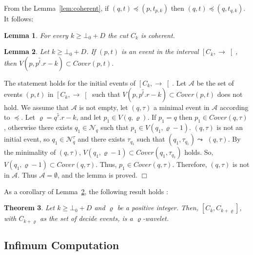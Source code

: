 \documentclass[11pt]{article}
\newenvironment{proof}{{\bf Proof. } }{{\hfill $\Box$}\vspace{.5pc}}
\newtheorem{theorem}{Theorem}[section]
\newtheorem{lemma}[theorem]{Lemma}
\begin{document}
From the Lemma~\ref{lem:coherent},  
if $\left( q,t\right) \preceq \left( p,t_{p,k}\right) $ then $\left( q,t\right)
\preceq \left( q,t_{q,k}\right) $. It follows:

\begin{lemma}
For every $k\geq \bot _{0} +D$ the cut $C_{k}$ is coherent.
\end{lemma}



\begin{lemma}
\label{lem:cover}
Let $k\geq \bot_0 + D$. If $\left( p,t\right) $ is an event in the interval  
$\left[ C_{k},\rightarrow \right[ $, then $V(p,\widetilde{p^{t}.r}-k)\subset
Cover(p,t)$.
\end{lemma}

\begin{proof}
The statement holds for the initial events of $\left[ C_{k},\rightarrow
\right[ $. Let $\mathcal{A}$ be the set of events $(p,t)$ in  $\left[
C_{k},\rightarrow \right[ $ such that $V(p,\widetilde{p^{t}.r}-k)\subset
Cover(p,t)$ does not hold.  We assume that $\mathcal{A}$ is not empty, let $(q,\tau )$ a minimal event in $\mathcal{A}$ according to $\preceq $. 
Let $\varrho =\widetilde{q^{\tau }.r}-k$, and let $p_{1}\in V(q,\varrho )$. 
If $p_{1}=q$ then $p_{1}\in Cover(q,\tau )$, otherwise there exists $q_{1}\in 
\mathcal{N}_{q}$ such that $p_{1}\in V(q_{1},\varrho -1)$. $(q,\tau )$ is not
an initial event, so $q_{1}\in \mathcal{N}_{q}^{\tau }$ and there exists $\tau _{q_{1}}$ such that $\left( q_{1},\tau _{q_{1}}\right) \leadsto $ $\left( q,\tau \right)$.  By the minimality of $(q,\tau )$, 
$V(q_{1},\varrho -1) \subset Cover(q_{1},\tau _{q_{1}})$ holds.  So,  
$V(q_{1},\varrho -1)\subset Cover(q,\tau )$. Thus, $p_{1}\in Cover(q,\tau )$.
Therefore, $(q,\tau )$ is not in $\mathcal{A}$. Thus  $\mathcal{A=}\emptyset $, 
and the lemma is proved.
\end{proof}

As a corollary of Lemma~\ref{lem:cover}, the following result holds : 

\begin{theorem}
\label{th:unison_behavior}
Let $k\geq \bot_0 +D$ and $\varrho $ be a positive integer. Then, 
$\left[C_{k},C_{k+\varrho }\right] $, with $C_{k+\varrho }$ as the set of decide events, 
is a $\varrho$-wavelet.
\end{theorem}



\subsection{Infimum Computation}
\label{ssec:infimum_calcul}
\end{document}
